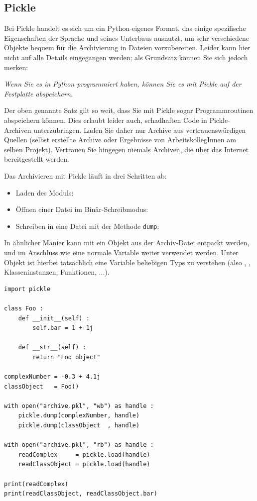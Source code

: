 \subsection{Pickle}
Bei Pickle handelt es sich um ein Python-eigenes Format, das einige spezifische Eigenschaften der Sprache und seines Unterbaus ausnutzt, um sehr verschiedene Objekte bequem für die Archivierung in Dateien vorzubereiten. Leider kann hier nicht auf alle Details eingegangen werden; als Grundsatz können Sie sich jedoch merken:
\begin{center}
	\emph{Wenn Sie es in Python programmiert haben, können Sie es mit Pickle auf der Festplatte abspeichern.}
\end{center}

\begin{warnbox}
Der oben genannte Satz gilt so weit, dass Sie mit Pickle sogar Programmroutinen abspeichern können. Dies erlaubt leider auch, schadhaften Code in Pickle-Archiven unterzubringen. Laden Sie daher nur Archive aus vertrauenswürdigen Quellen (\eg selbst erstellte Archive oder Ergebnisse von ArbeitskollegInnen am selben Projekt). Vertrauen Sie hingegen niemals Archiven, die über das Internet bereitgestellt werden.
\end{warnbox}

Das Archivieren mit Pickle läuft in drei Schritten ab: 
\begin{itemize}
\item Laden des Moduls: 
\item Öffnen einer Datei im Binär-Schreibmodus: 
\item Schreiben in eine Datei mit der Methode \texttt{dump}: 
\end{itemize}

In ähnlicher Manier kann mit  ein Objekt aus der Archiv-Datei entpackt werden, und im Anschluss wie eine normale Variable weiter verwendet werden. Unter Objekt ist hierbei tatsächlich eine Variable beliebigen Typs zu verstehen (also \eg {}, , Klasseninstanzen, Funktionen, ...).

\begin{codebox}
\begin{verbatim}
import pickle

class Foo :
    def __init__(self) :
        self.bar = 1 + 1j
        
    def __str__(self) :
        return "Foo object"

complexNumber = -0.3 + 4.1j
classObject   = Foo()

with open("archive.pkl", "wb") as handle :
    pickle.dump(complexNumber, handle)
    pickle.dump(classObject  , handle)

with open("archive.pkl", "rb") as handle :
    readComplex     = pickle.load(handle)
    readClassObject = pickle.load(handle)

print(readComplex)
print(readClassObject, readClassObject.bar)
\end{verbatim}
\end{codebox}

